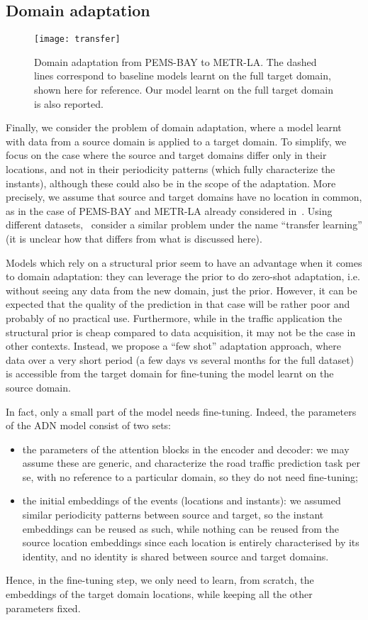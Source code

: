 \documentclass[a4paper]{article}
\begin{document}
\subsection{Domain adaptation}
\begin{figure}
\begin{center}
\texttt{[image: transfer]}
\end{center}
\caption{\label{fig:domain-adaptation}Domain adaptation from PEMS-BAY to METR-LA. The dashed lines correspond to baseline models learnt on the full target domain, shown here for reference. Our model learnt on the full target domain is also reported.}
\end{figure}
Finally, we consider the problem of domain adaptation, where a model learnt with data from a source domain is applied to a target domain. To simplify, we focus on the case where the source and target domains differ only in their locations, and not in their periodicity patterns (which fully characterize the instants), although these could also be in the scope of the adaptation. More precisely, we assume that source and target domains have no location in common, as in the case of PEMS-BAY and METR-LA already considered in~\cite{kong_stgat_2020}. Using different datasets,~\cite{mallick_transfer_2020} consider a similar problem under the name ``transfer learning'' (it is unclear how that differs from what is discussed here).

Models which rely on a structural prior seem to have an advantage when it comes to domain adaptation: they can leverage the prior to do zero-shot adaptation, i.e. without seeing any data from the new domain, just the prior. However, it can be expected that the quality of the prediction in that case will be rather poor and probably of no practical use. Furthermore, while in the traffic application the structural prior is cheap compared to data acquisition, it may not be the case in other contexts. Instead, we propose a ``few shot'' adaptation approach, where data over a very short period (a few days vs several months for the full dataset) is accessible from the target domain for fine-tuning the model learnt on the source domain.

In fact, only a small part of the model needs fine-tuning. Indeed, the parameters of the ADN model consist of two sets:
\begin{itemize}
\item the parameters of the attention blocks in the encoder and decoder: we may assume these are generic, and characterize the road traffic prediction task per se, with no reference to a particular domain, so they do not need fine-tuning;
\item the initial embeddings of the events (locations and instants): we assumed similar periodicity patterns between source and target, so the instant embeddings can be reused as such, while nothing can be reused from the source location embeddings since each location is entirely characterised by its identity, and no identity is shared between source and target domains.
\end{itemize}
Hence, in the fine-tuning step, we only need to learn, from scratch, the embeddings of the target domain locations, while keeping all the other parameters fixed.
\end{document}
